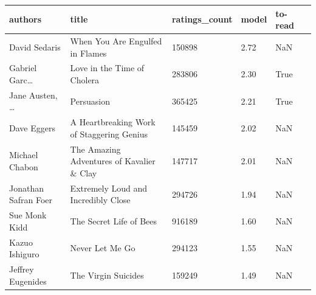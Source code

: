 \documentclass[handout]{beamer}
\begin{document}
\begin{frame}
 \begin{table}
\centering
\begin{tabular}{p{3cm}p{4.5cm}Hlll}
\toprule
                                         authors &                                              title &  ratings\_count &  model & to-read \\
\midrule
                                   David Sedaris &                    When You Are Engulfed in Flames &         150898 &   2.72 &     NaN \\
          Gabriel Garc\ldots%
           &                        Love in the Time of Cholera &         283806 &   2.30 &    True \\
 Jane Austen, \ldots%
  &                                         Persuasion &         365425 &   2.21 &    True \\
                                     Dave Eggers &          A Heartbreaking Work of Staggering Genius &         145459 &   2.02 &     NaN \\
                                  Michael Chabon &          The Amazing Adventures of Kavalier \& Clay &         147717 &   2.01 &     NaN \\
                            Jonathan Safran Foer &                Extremely Loud and Incredibly Close &         294726 &   1.94 &     NaN \\
                                   Sue Monk Kidd &                            The Secret Life of Bees &         916189 &   1.60 &     NaN \\
                                  Kazuo Ishiguro &                                    Never Let Me Go &         294123 &   1.55 &     NaN \\
                               Jeffrey Eugenides &                                The Virgin Suicides &         159249 &   1.49 &     NaN \\

\end{tabular}
\end{table}
\end{frame}
\end{document}
